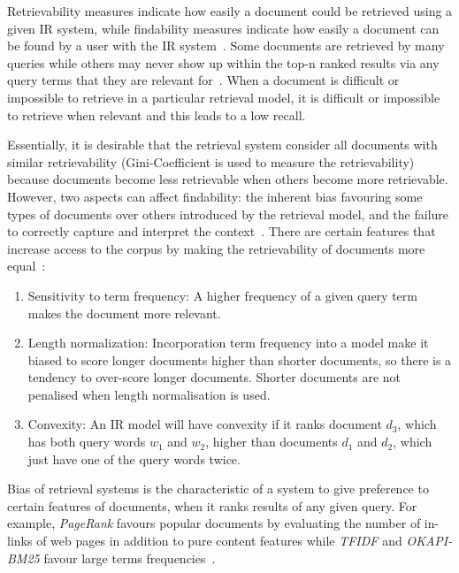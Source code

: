 Retrievability measures indicate how easily a document could be retrieved using a given IR system, while findability measures indicate how easily a document can be found by a user with the IR system~\citep{azzopardi2008retrievability}. Some documents are retrieved by many queries while others may never show up within the top-n ranked results via any query terms that they are relevant for~\citep{lupu2013patent}. When a document is difficult or impossible to retrieve in a particular retrieval model, it is difficult or impossible to retrieve when relevant and this leads to a low recall. 

Essentially, it is desirable that the retrieval system consider all documents with similar retrievability (Gini-Coefficient is used to measure the retrievability) because documents become less retrievable when others become more retrievable. However, two aspects can affect findability: the inherent bias favouring some types of documents over others introduced by the retrieval model, and the failure to correctly capture and interpret the context~\citep{bashir2009improving, bashir2011relationship}. There are certain features that increase access to the corpus by making the retrievability of documents more equal~\citep{bache2010improving}:
\begin{enumerate}
\item Sensitivity to term frequency: A higher frequency of a given query term makes the document more relevant.
\item Length normalization: Incorporation term frequency into a model make it biased to score longer documents higher than shorter documents, so there is a tendency to over-score longer documents. Shorter documents are not penalised when length normalisation is used.
\item Convexity: An IR model will have convexity if it ranks document $ d_{3} $, which has both query words $ w_{1} $ and $ w_{2} $, higher than documents $ d_{1} $ and $ d_{2} $, which just have one of the query words twice. 
\end{enumerate}
Bias of retrieval systems is the characteristic of a system to give preference to certain features of documents, when it ranks results of any given query. For example, \textit{PageRank} favours popular documents by evaluating the number of in-links of web pages in addition to pure content features while \textit{TFIDF} and \textit{OKAPI-BM25} favour large terms frequencies~\citep{bashir2011relationship}.
